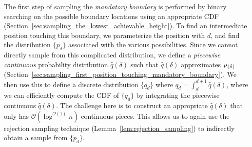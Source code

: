 The first step of sampling the \emph{mandatory boundary} is performed
by binary searching on the possible boundary locations using an appropriate CDF (Section~\ref{sec:sampling_the_lowest_achievable_height}).
To find an intermediate position touching this boundary, we parameterize the position with $d$,
and find the distribution $\{p_d\}$ associated with the various possibilities.
Since we cannot directly sample from this complicated distribution, we define a \emph{piecewise continuous} probability distribution
$\hat q(\delta)$ such that $\hat q(\delta)$ approximates $p_{\lfloor\delta\rfloor}$ (Section~\ref{sec:sampling_first_position_touching_mandatory_boundary}).
We then use this to define a discrete distribution $\{q_d\}$ where $q_d = \int_d^{d+1}\hat q(\delta)$,
where we can efficiently compute the CDF of $\{q_d\}$ by integrating the piecewise continuous $\hat q(\delta)$.
The challenge here is to construct an appropriate $\hat q(\delta)$ that only has $\mathcal O(\log^{\mathcal O(1)} n)$ continuous pieces.
This allows us to again use the rejection sampling technique (Lemma~\ref{lem:rejection_sampling}) to indirectly obtain a sample from $\{p_d\}$.

